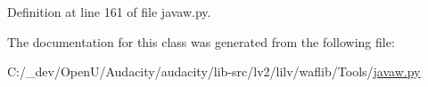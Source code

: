 Definition at line 161 of file javaw.\+py.



The documentation for this class was generated from the following file\+:\begin{DoxyCompactItemize}
\item 
C\+:/\+\_\+dev/\+Open\+U/\+Audacity/audacity/lib-\/src/lv2/lilv/waflib/\+Tools/\hyperlink{lilv_2waflib_2_tools_2javaw_8py}{javaw.\+py}\end{DoxyCompactItemize}
